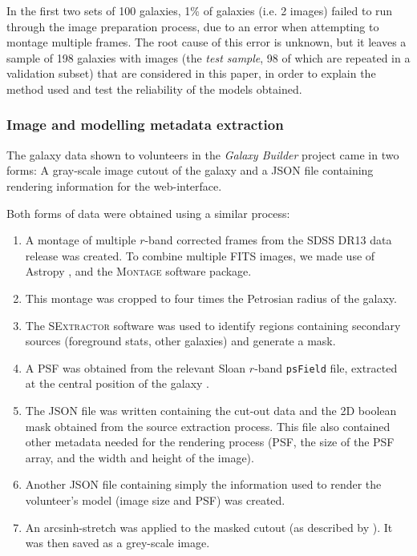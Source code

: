 \documentclass[trackchanges]{aastex63}
\begin{document}
In the first two sets of 100 galaxies, 1\% of galaxies (i.e. 2 images) failed to run through the image preparation process, due to an error when attempting to montage multiple frames. The root cause of this error is unknown, but it leaves a sample of 198 galaxies with images (the \textit{test sample}, 98 of which are repeated in a validation subset) that are considered in this paper, in order to explain the method used and test the reliability of the models obtained.

\subsubsection{Image and modelling metadata extraction}
\label{sec:image_creation}

The galaxy data shown to volunteers in the \textit{Galaxy Builder} project came in two forms: A gray-scale image cutout of the galaxy and a JSON file containing rendering information for the web-interface.

Both forms of data were obtained using a similar process:

\begin{enumerate}
\item A montage of multiple $r$-band corrected frames from the SDSS DR13 \citep{2017ApJS..233...25A} data release was created. To combine multiple FITS images, we made use of Astropy \citep{2018AJ....156..123A}, and the \textsc{Montage} \citep{2010arXiv1005.4454J} software package.
\item This montage was cropped to four times the Petrosian radius of the galaxy.
\item The \textsc{SExtractor} software \citep{source-extractor} was used to identify regions containing secondary sources (foreground stats, other galaxies) and generate a mask.
\item A PSF was obtained from the relevant Sloan $r$-band \texttt{psField} file, extracted at the central position of the galaxy \citep{2002AJ....123..485S}.
\item The JSON file was written containing the cut-out data and the 2D boolean mask obtained from the source extraction process. This file also contained other metadata needed for the rendering process (PSF, the size of the PSF array, and the width and height of the image).
\item Another JSON file containing simply the information used to render the volunteer's model (image size and PSF) was created.
\item An arcsinh-stretch was applied to the masked cutout (as described by \citealt{Lupton2003:astro-ph/0312483v1}). It was then saved as a grey-scale image.
\end{enumerate}
\end{document}
